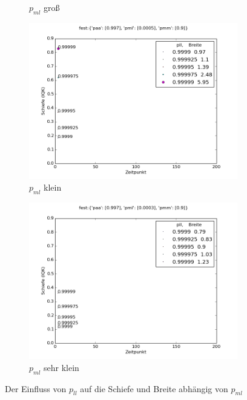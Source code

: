 \begin{figure}[h]
\begin{subfigure}[t]{0.49\textwidth}
\caption{$p_{ml}$ groß}
\label{einfluss_pll_pml+}
\end{subfigure}
\vspace*{7mm}
\begin{subfigure}[b]{0.49\textwidth}
\includegraphics[width=\textwidth]{bilder/pll/3fest_09_00005_0997_p}
\caption{$p_{ml}$ klein}
\label{einfluss_pll_pml-}
\end{subfigure}
\begin{subfigure}[b]{0.49\textwidth}
\includegraphics[width=\textwidth]{bilder/pll/3fest_09_00003_0997_p}
\caption{$p_{ml}$ sehr klein}
\label{einfluss_pll_pml--}
\end{subfigure}
\caption{Der Einfluss von $p_{ll}$ auf die Schiefe und Breite abhängig von $p_{ml}$}
\label{einfluss_pll_pml}
\end{figure}

